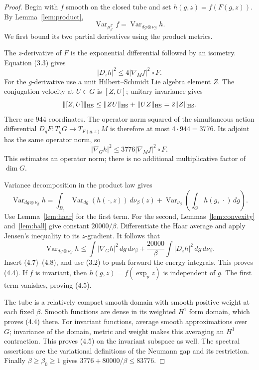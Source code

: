 \documentclass[11pt,oneside]{article}
\DeclareMathOperator{\Var}{Var}
\newcommand{\cT}{\mathcal T}
\begin{document}
\begin{proof}
Begin with \(f\) smooth on the closed tube
and set \(h(g,z)=f(F(g,z))\). By
Lemma~\ref{lem:product},
\[
          \Var_{\mu_\beta^{\cT}}f
                     =\Var_{dg\otimes\nu_\beta}h .
\]
We first bound its two partial derivatives
using the product metrics.

The \(z\)-derivative of \(F\) is the
exponential differential followed by an
isometry. Equation (3.3) gives
\[
                |D_zh|^2\le4|\nabla_M f|^2\circ F.
 \tag{4.7}
\]
For the \(g\)-derivative use a unit
Hilbert--Schmidt Lie algebra element \(Z\).
The conjugation velocity at \(U\in G\)
is \([Z,U]\); unitary invariance gives
\[
 \|[Z,U]\|_{\rm HS}
 \le\|ZU\|_{\rm HS}+\|UZ\|_{\rm HS}
                                  =2\|Z\|_{\rm HS}.
\]
There are 944 coordinates. The operator
norm squared of the simultaneous action
differential \(D_gF:T_gG\to T_{F(g,z)}M\)
is therefore at most \(4\cdot944=3776\).
Its adjoint has the same operator norm,
so
\[
                 |\nabla_Gh|^2
                         \le3776|\nabla_Mf|^2\circ F.
 \tag{4.8}
\]
This estimates an operator norm; there is
no additional multiplicative factor of
\(\dim G\).

Variance decomposition in the product law gives
\[
 \Var_{dg\otimes\nu_\beta}h
   =\int_{B_\epsilon}\Var_{dg}(h(\,\cdot,z))\,d\nu_\beta(z)
      +\Var_{\nu_\beta}\!\left(\int_Gh(g,\,\cdot)\,dg\right).
 \tag{4.9}
\]
Use Lemma~\ref{lem:haar} for the first term.
For the second, Lemmas~\ref{lem:convexity}
and~\ref{lem:ball} give constant \(20000/\beta\).
Differentiate the Haar average and apply
Jensen's inequality to its \(z\)-gradient.
It follows that
\[
 \Var_{dg\otimes\nu_\beta}h
 \le\int|\nabla_Gh|^2\,dg\,d\nu_\beta
       +\frac{20000}{\beta}
                          \int|D_zh|^2\,dg\,d\nu_\beta .
\]
Insert (4.7)--(4.8), and use (3.2) to
push forward the energy integrals. This
proves (4.4). If \(f\) is invariant, then
\(h(g,z)=f(\exp_pz)\) is independent of
\(g\). The first term vanishes, proving
(4.5).

The tube is a relatively compact smooth
domain with smooth positive weight at
each fixed \(\beta\). Smooth functions
are dense in its weighted \(H^1\) form
domain, which proves (4.4) there.
For invariant functions, average smooth
approximations over \(G\); invariance
of the domain, metric and weight makes
this averaging an \(H^1\) contraction.
This proves (4.5) on the invariant
subspace as well. The spectral assertions
are the variational definitions of the
Neumann gap and its restriction.
Finally \(\beta\ge\beta_0\ge1\) gives
\(3776+80000/\beta\le83776\).
\end{proof}
\end{document}
